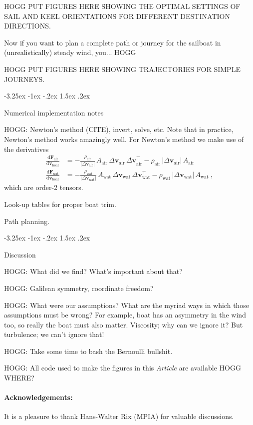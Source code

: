 \documentclass{article}
\makeatletter
\newcommand{\dd}{\mathrm{d}}
\renewcommand{\vec}[1]{\boldsymbol{#1}}
\newcommand{\air}{\text{air}}
\newcommand{\water}{\text{wat}}
\newcommand{\boat}{\text{boat}}
\newcommand{\vair}{\vec{v}_\air}
\newcommand{\vwater}{\vec{v}_\water}
\newcommand{\vboat}{\vec{v}_\boat}
\newcommand{\documentname}{\textsl{Article}}
\renewcommand\section{\@startsection {section}{1}{\z@}%
  {-3.25ex \@plus -1ex \@minus -.2ex}%
  {1.5ex \@plus .2ex}%
  {\raggedright\normalfont\large\bfseries}}
\makeatother
\begin{document}
HOGG PUT FIGURES HERE SHOWING THE OPTIMAL SETTINGS OF SAIL AND KEEL ORIENTATIONS FOR DIFFERENT DESTINATION DIRECTIONS.

Now if you want to plan a complete path or journey for the sailboat in (unrealistically) steady wind, you... HOGG

HOGG PUT FIGURES HERE SHOWING TRAJECTORIES FOR SIMPLE JOURNEYS.

\section{Numerical implementation notes}\label{sec:implementation}

HOGG: Newton's method (CITE), invert, solve, etc.
Note that in practice, Newton's method works amazingly well.
For Newton's method we make use of the derivatives
\begin{align}
    \frac{\dd\vec{F}_\air}{\dd\vboat} &= -\frac{\rho_\air}{|\Delta\vair|}\,A_\air\,\Delta\vair\,\Delta\vair^\top-\rho_\air\,|\Delta\vair|\,A_\air
    \\
    \frac{\dd\vec{F}_\water}{\dd\vboat} &= -\frac{\rho_\water}{|\Delta\vwater|}\,A_\water\,\Delta\vwater\,\Delta\vwater^\top-\rho_\water\,|\Delta\vwater|\,A_\water
    ~,
\end{align}
which are order-2 tensors.

Look-up tables for proper boat trim.

Path planning.

\section{Discussion}\label{sec:discussion}

HOGG: What did we find? What's important about that?

HOGG: Galilean symmetry, coordinate freedom?

HOGG: What were our assumptions? What are the myriad ways in which those assumptions must be wrong? For example, boat has an asymmetry in the wind too, so really the boat must also matter. Viscosity; why can we ignore it? But turbulence; we can't ignore that!

HOGG: Take some time to bash the Bernoulli bullshit.

HOGG: All code used to make the figures in this \documentname{} are available HOGG WHERE?

\paragraph{Acknowledgements:}
It is a pleasure to thank Hans-Walter Rix (MPIA) for valuable discussions.

\raggedright
\printbibliography
\end{document}
